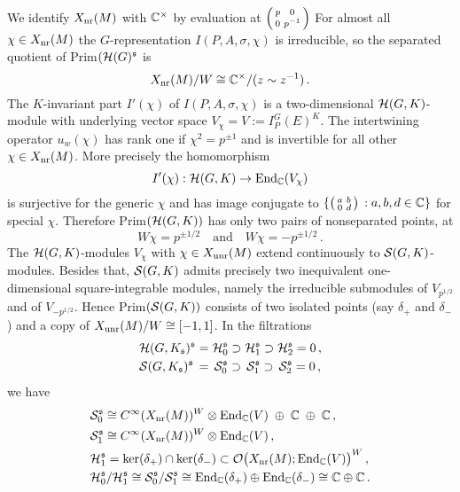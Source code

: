 We identify $X_{\mathrm{nr}} (M)$ with $\mathbb C^\times$ by evaluation at $\left(\begin{smallmatrix} p & 0 \\ 0 & p^{-1} \end{smallmatrix}\right)$ 
For almost all $\chi \in X_{\mathrm{nr}} (M)$ the $G$-representation $I(P,A,\sigma ,\chi )$ 
is irreducible, so the separated quotient of Prim$( \mathcal H (G )^{\mathfrak s}$ is 
\[
X_{\mathrm{nr}} (M) / W \cong \mathbb C^\times / (z \sim z^{-1}) \,.
\]
The $K$-invariant part $I' (\chi)$ of $I(P,A,\sigma ,\chi )$ is a two-dimensional 
$\mathcal H (G,K)$-module with underlying vector space $V_\chi = V := I_P^G (E)^K$.
The intertwining operator $u_w (\chi )$ has rank one if $\chi^2 = p^{\pm 1}$
and is invertible for all other $\chi \in X_{\mathrm{nr}} (M)$. 
More precisely the homomorphism
\[
I' (\chi ) : \mathcal H (G,K) \to \mathrm{End}_{\mathbb C} (V_\chi )
\]
is surjective for the generic $\chi$ and has image conjugate to
$\{ \left(\begin{smallmatrix} a & b \\ 0 & d \end{smallmatrix}\right) \,: a,b,d \in \mathbb C \}$ for special $\chi$. Therefore Prim$
(\mathcal H (G,K))$ has only two pairs of nonseparated points, at
\begin{equation}
W \chi = p^{\pm 1/2} \quad \text{and} \quad W \chi = -p^{\pm 1/2} \,.
\end{equation}
The $\mathcal H (G,K)$-modules $V_\chi$ with $\chi \in X_{\mathrm{unr}} (M)$
extend continuously to $\mathcal S (G,K)$-modules. Besides that, $\mathcal S (G,K)$
admits precisely two inequivalent one-dimensional square-integrable modules,
namely the irreducible submodules of $V_{p^{1/2}}$ and of $V_{-p^{1/2}}$. Hence 
Prim$ (\mathcal S(G,K))$ consists of two isolated points (say $\delta_+$ and 
$\delta_-$) and a copy of $X_{\mathrm{unr}} (M) / W \cong [-1,1]$.
In the filtrations 
\begin{align*}
&\mathcal H (G, K_{\mathfrak s})^{\mathfrak s} = \mathcal H^{\mathfrak s}_0 \supset \mathcal H^{\mathfrak s}_1 
\supset \mathcal H^{\mathfrak s}_2 = 0 \,, \\ 
&\mathcal S (G, K_{\mathfrak s})^{\mathfrak s} \, = \,\mathcal S^{\mathfrak s}_0 \supset \, \mathcal S^{\mathfrak s}_1  
\supset \, \mathcal S^{\mathfrak s}_2 = 0 \,,
\end{align*}
we have
\begin{align*}
& \mathcal S_0^{\mathfrak s} \cong C^\infty (X_{\mathrm{nr}} (M))^W \otimes 
\mathrm{End}_{\mathbb C} (V) \; \oplus \; \mathbb C \; \oplus \; \mathbb C \,,\\
& \mathcal S_1^{\mathfrak s} \cong C^\infty (X_{\mathrm{nr}} (M))^W \otimes 
\mathrm{End}_{\mathbb C} (V) \,,\\
& \mathcal H_1^{\mathfrak s} = \ker (\delta_+ ) \cap \ker (\delta_- )  \subset
\mathcal O \big( X_{\mathrm{nr}} (M) ;\mathrm{End}_{\mathbb C} (V) \big)^W \,, \\
& \mathcal H_0^{\mathfrak s} / \mathcal H_1^{\mathfrak s} \cong \mathcal S_0^{\mathfrak s} / \mathcal S_1^{\mathfrak s}
\cong \mathrm{End}_{\mathbb C}(\delta_+ ) \oplus \mathrm{End}_{\mathbb C}(\delta_- ) \cong  
\mathbb C \oplus \mathbb C \,.
\end{align*}
